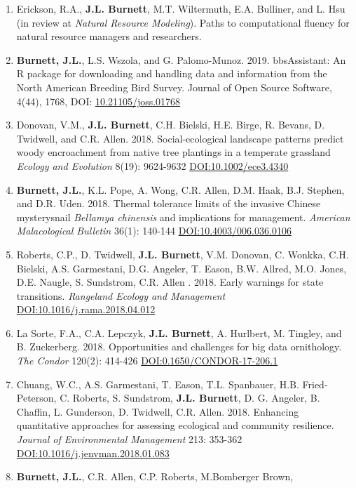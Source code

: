 \documentclass[11pt,]{article}
\begin{document}
\begin{enumerate}
\def\labelenumi{\arabic{enumi}.}
\item
  Erickson, R.A., \textbf{J.L. Burnett}, M.T. Wiltermuth, E.A. Bulliner,
  and L. Hsu (in review at \emph{Natural Resource Modeling}). Paths to
  computational fluency for natural resource managers and researchers.
\item
  \textbf{Burnett, J.L.}, L.S. Wszola, and G. Palomo-Munoz. 2019.
  bbsAssistant: An R package for downloading and handling data and
  information from the North American Breeding Bird Survey. Journal of
  Open Source Software, 4(44), 1768, DOI:
  \href{https://doi.org/10.21105/joss.01768}{10.21105/joss.01768}
\item
  Donovan, V.M., \textbf{J.L. Burnett}, C.H. Bielski, H.E. Birge, R.
  Bevans, D. Twidwell, and C.R. Allen. 2018. Social-ecological landscape
  patterns predict woody encroachment from native tree plantings in a
  temperate grassland \emph{Ecology and Evolution} 8(19): 9624-9632
  \url{DOI:10.1002/ece3.4340}
\item
  \textbf{Burnett, J.L.}, K.L. Pope, A. Wong, C.R. Allen, D.M. Haak,
  B.J. Stephen, and D.R. Uden. 2018. Thermal tolerance limits of the
  invasive Chinese mysterysnail \emph{Bellamya chinensis} and
  implications for management. \emph{American Malacological Bulletin}
  36(1): 140-144 \url{DOI:10.4003/006.036.0106}
\item
  Roberts, C.P., D. Twidwell, \textbf{J.L. Burnett}, V.M. Donovan, C.
  Wonkka, C.H. Bielski, A.S. Garmestani, D.G. Angeler, T. Eason, B.W.
  Allred, M.O. Jones, D.E. Naugle, S. Sundstrom, C.R. Allen . 2018.
  Early warnings for state transitions. \emph{Rangeland Ecology and
  Management} \url{DOI:10.1016/j.rama.2018.04.012}
\item
  La Sorte, F.A., C.A. Lepczyk, \textbf{J.L. Burnett}, A. Hurlbert, M.
  Tingley, and B. Zuckerberg. 2018. Opportunities and challenges for big
  data ornithology. \emph{The Condor} 120(2): 414-426
  \url{DOI:0.1650/CONDOR-17-206.1}
\item
  Chuang, W.C., A.S. Garmestani, T. Eason, T.L. Spanbauer, H.B.
  Fried-Peterson, C. Roberts, S. Sundstrom, \textbf{J.L. Burnett}, D. G.
  Angeler, B. Chaffin, L. Gunderson, D. Twidwell, C.R. Allen. 2018.
  Enhancing quantitative approaches for assessing ecological and
  community resilience. \emph{Journal of Environmental Management} 213:
  353-362 \url{DOI:10.1016/j.jenvman.2018.01.083}
\item
  \textbf{Burnett, J.L.}, C.R. Allen, C.P. Roberts, M.Bomberger Brown,

\end{enumerate}
\end{document}
